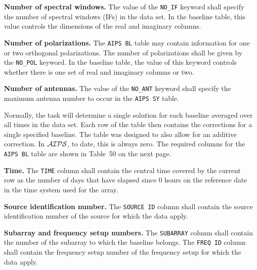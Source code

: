 \documentclass[twoside]{article}
\newcommand{\AIPS}{{$\cal AIPS\/$}}
\begin{document}
{\bf Number of spectral windows.} The value of the {\tt NO\_IF}
keyword shall specify the number of spectral windows (IFs) in the data
set.  In the baseline table, this value controls the dimensions of the
real and imaginary columns.

{\bf Number of polarizations.}  The {\tt AIPS BL} table may contain
information for one or two orthogonal polarizations.  The number of
polarizations shall be given by the {\tt NO\_POL} keyword.   In the
baseline table, the value of this keyword controls whether there is
one set of real and imaginary columns or two.

{\bf Number of antennas.} The value of the {\tt NO\_ANT} keyword shall
specify the maximum antenna number to occur in the {\tt AIPS SY} table.

Normally, the task will determine a single solution for each baseline
averaged over all times in the data set.  Each row of the table then
contains the corrections for a single specified baseline.  The table
was designed to also allow for an additive correction.  In \AIPS, to
date, this is always zero.  The required columns for the {\tt AIPS
  BL} table are shown in Table~50 on the next page.

{\bf Time.}  The {\tt TIME} column shall contain the central time
covered by the current row as the number of days that have elapsed
since 0 hours on the reference date in the time system used for the
array.

{\bf Source identification number.}  The {\tt SOURCE ID} column shall
contain the source identification number of the source for which the
data apply.

{\bf Subarray  and frequency setup numbers.} The {\tt SUBARRAY} column
shall contain the number of the subarray to which the baseline belongs.
The {\tt FREQ ID} column shall contain the frequency setup number of
the frequency setup for which the data apply.
\vfill\eject
\end{document}
